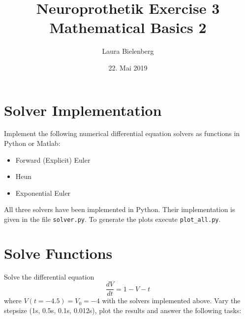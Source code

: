 \documentclass{scrartcl}			%
\title{Neuroprothetik Exercise 3 \\ Mathematical Basics 2}
\author{ Laura Bielenberg }
\date{22. Mai 2019}
\begin{document}

\maketitle

\section{Solver Implementation}	
Implement the following numerical differential equation solvers as functions in Python or Matlab:
\begin{itemize}
\item Forward (Explicit) Euler
\item Heun
\item Exponential Euler
\end{itemize}
All three solvers have been implemented in Python. Their implementation is given in the file \texttt{solver.py}. To generate the plots execute \texttt{plot\_all.py}.

\section{Solve Functions}		%
\label{sec:solve}
Solve the differential equation 
\begin{equation}
	\frac{dV}{dt} = 1 - V - t
	\label{dgl1}
\end{equation}
where $V(t=-4.5) = V_0 = -4$ with the solvers implemented above. Vary the stepsize (1s, 0.5s, 0.1s, 0.012s), plot the results and answer the following tasks:
\end{document}
